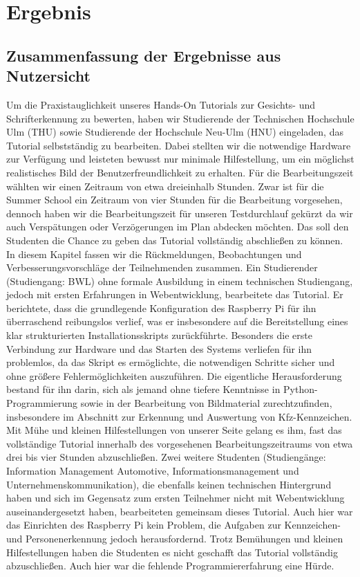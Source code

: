 \section{Ergebnis}
\subsection{Zusammenfassung der Ergebnisse aus Nutzersicht}
Um die Praxistauglichkeit unseres Hands-On Tutorials zur Gesichts- und Schrifterkennung zu bewerten, haben wir Studierende der Technischen Hochschule Ulm (THU) sowie Studierende der Hochschule Neu-Ulm (HNU) eingeladen, das Tutorial selbstständig zu bearbeiten. Dabei stellten wir die notwendige Hardware zur Verfügung und leisteten bewusst nur minimale Hilfestellung, um ein möglichst realistisches Bild der Benutzerfreundlichkeit zu erhalten. Für die Bearbeitungszeit wählten wir einen Zeitraum von etwa dreieinhalb Stunden. Zwar ist für die Summer School ein Zeitraum von vier Stunden für die Bearbeitung vorgesehen, dennoch haben wir die Bearbeitungszeit für unseren Testdurchlauf 
gekürzt da wir auch Verspätungen oder Verzögerungen im Plan abdecken möchten. Das soll den Studenten die Chance zu geben das Tutorial vollständig abschließen zu können. In diesem Kapitel fassen wir die Rückmeldungen, Beobachtungen und Verbesserungsvorschläge der Teilnehmenden zusammen. \singlespacing
Ein Studierender (Studiengang: BWL) ohne formale Ausbildung in einem technischen Studiengang, jedoch mit ersten Erfahrungen in Webentwicklung, bearbeitete das Tutorial. Er berichtete, dass die grundlegende Konfiguration des Raspberry Pi für ihn überraschend reibungslos verlief, was er insbesondere auf die Bereitstellung eines klar strukturierten Installationsskripts zurückführte. Besonders die erste Verbindung zur Hardware und das Starten des Systems verliefen für ihn problemlos, da das Skript es ermöglichte, die notwendigen Schritte sicher und ohne größere Fehlermöglichkeiten auszuführen. Die eigentliche Herausforderung bestand für ihn darin, sich als jemand ohne tiefere Kenntnisse in Python-Programmierung sowie in der Bearbeitung von Bildmaterial zurechtzufinden, insbesondere im Abschnitt zur Erkennung und Auswertung von Kfz-Kennzeichen. Mit Mühe und kleinen Hilfestellungen von unserer Seite gelang es ihm, fast das vollständige Tutorial innerhalb des vorgesehenen Bearbeitungszeitraums von etwa drei bis vier Stunden abzuschließen. Zwei weitere Studenten (Studiengänge: Information Management Automotive, Informationsmanagement und Unternehmenskommunikation), die ebenfalls keinen technischen Hintergrund haben und sich im Gegensatz zum ersten Teilnehmer nicht mit Webentwicklung auseinandergesetzt haben, bearbeiteten gemeinsam dieses Tutorial. Auch hier war das Einrichten des Raspberry Pi kein Problem, die Aufgaben zur Kennzeichen- und Personenerkennung jedoch herausfordernd. Trotz Bemühungen und kleinen Hilfestellungen haben die Studenten es nicht geschafft das Tutorial vollständig abzuschließen. Auch hier war die fehlende Programmiererfahrung eine Hürde.
